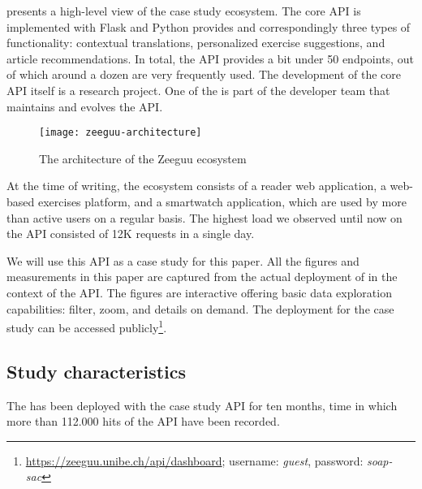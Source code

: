    presents a high-level view of the case study ecosystem.  The core API is implemented with Flask and Python provides and correspondingly three types of functionality: contextual translations, personalized exercise suggestions, and article recommendations. In total, the API provides a bit under 50 endpoints, out of which around a dozen are very frequently used. The development of the core API itself is a research project. One of the is part of the developer team that maintains and evolves the \zee API. 


    \begin{figure}[h!]
      \centering
      \texttt{[image: zeeguu-architecture]}
      \caption{The architecture of the Zeeguu ecosystem}
      \label{fig:zeeguuarch}
    \end{figure}  


  At the time of writing, the ecosystem consists of a reader web application, a web-based exercises platform, and a smartwatch application, which are used by more than \activeUserCount active users on a regular basis. The highest load we observed until now on the API consisted of 12K requests in a single day.

  
  We will use this \zee API as a case study for this paper. 
  All the figures and measurements in this paper are captured from the actual deployment of \tool in the context of the \zee API. The figures are interactive offering basic data exploration capabilities: filter, zoom, and details on demand\cite{Shne99a}. The \tool deployment for the case study can be accessed publicly\footnote{\url{https://zeeguu.unibe.ch/api/dashboard}; username: {\em guest}, password: {\em soap-sac}}. 



\subsection*{Study characteristics}

The \tool has been deployed with the case study API for 
ten months, time in which more than 112.000 hits of the API have 
been recorded. 

